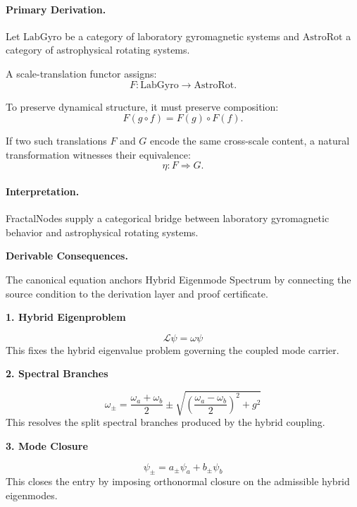 \paragraph{Primary Derivation.}
Let $\mathrm{LabGyro}$ be a category of laboratory gyromagnetic systems and $\mathrm{AstroRot}$ a category of astrophysical rotating systems.

A scale-translation functor assigns:
\begin{equation}
F:\mathrm{LabGyro}\to\mathrm{AstroRot}.
\end{equation}

To preserve dynamical structure, it must preserve composition:
\begin{equation}
F(g\circ f)=F(g)\circ F(f).
\end{equation}

If two such translations $F$ and $G$ encode the same cross-scale content, a natural transformation witnesses their equivalence:
\begin{equation}
\boxed{
\eta:F\Rightarrow G .
}
\end{equation}

\paragraph{Interpretation.}
FractalNodes supply a categorical bridge between laboratory gyromagnetic behavior and astrophysical rotating systems.

\par\vspace{0.35em}
\noindent\textbf{Derivable Consequences.}\quad
\begingroup
\footnotesize
\raggedright
The canonical equation anchors Hybrid Eigenmode Spectrum by connecting the source condition to the derivation layer and proof certificate.
\par\endgroup

\noindent\textbf{1. Hybrid Eigenproblem}\par
\[
\mathcal{L}\psi=\omega\psi
\]
\noindent This fixes the hybrid eigenvalue problem governing the coupled mode carrier.\par
\noindent\textbf{2. Spectral Branches}\par
\[
\omega_{\pm}=\frac{\omega_a+\omega_b}{2}\pm\sqrt{\left(\frac{\omega_a-\omega_b}{2}\right)^2+g^2}
\]
\noindent This resolves the split spectral branches produced by the hybrid coupling.\par
\noindent\textbf{3. Mode Closure}\par
\[
\psi_{\pm}=a_{\pm}\psi_a+b_{\pm}\psi_b
\]
\noindent This closes the entry by imposing orthonormal closure on the admissible hybrid eigenmodes.\par

